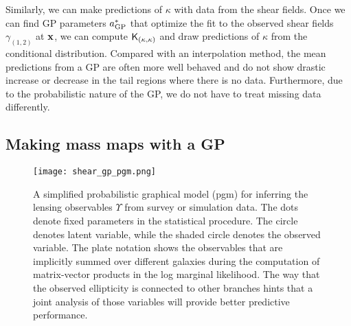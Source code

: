 Similarly, we can make predictions of $\kappa$ with data from the shear fields. 
Once we can find GP parameters $a_{\rm GP}^*$ that optimize the fit to
the observed shear fields $\gamma_{(1, 2)}$ at $\mathbf{x}$, we can compute $\mathsf{K}_{(\kappa,
\kappa)}$ and draw predictions of $\kappa$ from the conditional distribution. 
Compared with an interpolation method, the mean predictions from a GP are
often more well behaved and do not show drastic increase or decrease 
in the tail regions where there is no data. Furthermore, due to the
probabilistic nature of the GP, we do not have to treat missing 
data differently. 

\subsection{Making mass maps with a GP}
\begin{figure}
	\centering
	\texttt{[image: shear\_gp\_pgm.png]}
	\caption{A simplified probabilistic graphical model (pgm) for inferring
		the lensing observables $\Upsilon$ from survey or simulation data. The dots
		denote fixed parameters in the statistical procedure. The circle denotes
		latent variable, while the shaded circle denotes 
		the observed variable. The plate notation shows the observables that are
		implicitly summed over different galaxies during the computation of matrix-vector
		products in the log marginal likelihood. The way that the observed
		ellipticity is connected to other branches hints that a joint analysis of
		those variables will provide better predictive performance. 
		\label{fig:simplified_pgm}}
\end{figure}


